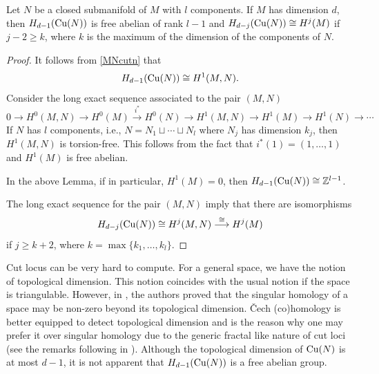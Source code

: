 \begin{lemma}\label{homcutn}
    Let $N$ be a closed submanifold of $M$ with $l$ components. If $M$ has dimension $d$, then $H_{d-1}(\mathrm{Cu}(N))$ is free abelian of rank $l-1$ and $H_{d-j}(\mathrm{Cu}(N))\cong H^j(M)$ if $j-2\geq k$, where $k$ is the maximum of the dimension of the components of $N$.
\end{lemma}
\begin{proof}
    It follows from \eqref{MNcutn} that 
    \begin{displaymath}
        H_{d-1}(\mathrm{Cu}(N))\cong H^1(M,N).
    \end{displaymath}
    Consider the long exact sequence associated to the pair $(M,N)$ 
    \begin{displaymath}
        0\to H^0(M,N)\to H^0(M)\stackrel{i^\ast}{\rightarrow} H^0(N)\to H^1(M,N)\to H^1(M)\to H^1(N)\to \cdots
    \end{displaymath}
    If $N$ has $l$ components, i.e., $N=N_1\sqcup \cdots\sqcup N_l$ where $N_j$ has dimension $k_j$, then $H^1(M,N)$ is torsion-free. This follows from the fact that $i^\ast(1)=(1,\ldots,1)$ and $H^1(M)$ is free abelian. 

    \vspace{0.1cm}
    \begin{rem}
        In the above  Lemma, if in particular, $H^1(M)=0$, then $H_{d-1}(\mathrm{Cu}(N))\cong \mathbb{Z}^{l-1}$.
    \end{rem}
    \hf The long exact sequence for the pair $(M,N)$ imply that there are isomorphisms
    \begin{equation}\label{cutnM}
        H_{d-j}(\mathrm{Cu}(N))\cong H^j(M,N)\stackrel{\cong}{\longrightarrow} H^j(M)
    \end{equation}
    if $j\geq k+2$, where $k=\max\{k_1,\ldots,k_l\}$. 
\end{proof}

\begin{rem}
    Cut locus can be very hard to compute. For a general space, we have the notion of topological dimension. This notion coincides with the usual notion if the space is triangulable. However, in \cite{BaMi62}, the authors proved that the singular homology of a space may be non-zero beyond its topological dimension. \v{C}ech (co)homology is better equipped to detect topological dimension and is the reason why one may prefer it over singular homology due to the generic fractal like nature of cut loci (see the remarks following  in ). Although the topological dimension of $\mathrm{Cu}(N)$ is at most $d-1$, it is not apparent that $H_{d-1}(\mathrm{Cu}(N))$ is a free abelian group. 
\end{rem}

